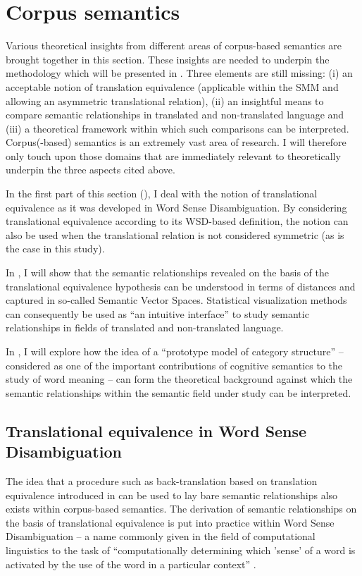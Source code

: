 \section{Corpus semantics}
\label{sec:2.4}  
Various theoretical insights from different areas of corpus-based semantics are brought together in this section. These insights are needed to underpin the methodology which will be presented in . Three elements are still missing: (i) an acceptable notion of translation equivalence (applicable within the SMM and allowing an asymmetric translational relation), (ii) an insightful means to compare semantic relationships in translated and non-translated language and (iii) a theoretical framework within which such comparisons can be interpreted. Corpus(-based) semantics is an extremely vast area of research. I will therefore only touch upon those domains that are immediately relevant to theoretically underpin the three aspects cited above.

In the first part of this section (), I deal with the notion of translational equivalence as it was developed in Word Sense Disambiguation. By considering translational equivalence according to its WSD-based definition, the notion can also be used when the translational relation is not considered symmetric (as is the case in this study).

In , I will show that the semantic relationships revealed on the basis of the translational equivalence hypothesis can be understood in terms of distances and captured in so-called Semantic Vector Spaces. Statistical visualization methods can consequently be used as “an intuitive interface” \citep*[17]{heylen_looking_2012} to study semantic relationships in fields of translated and non-translated language.

In , I will explore how the idea of a “prototype model of category structure” – considered as one of the important contributions of cognitive semantics to the study of word meaning \citep[577]{allan_lexical_2013} – can form the theoretical background against which the semantic relationships within the semantic field under study can be interpreted.

\subsection{Translational equivalence in Word Sense Disambiguation}
\label{sec:2.4.1}  
The idea that a procedure such as back-translation based on translation equivalence introduced in  can be used to lay bare semantic relationships also exists within corpus-based semantics. The derivation of semantic relationships on the basis of translational equivalence is put into practice within Word Sense Disambiguation – a name commonly given in the field of computational linguistics to the task of “computationally determining which 'sense' of a word is activated by the use of the word in a particular context” \citep[1]{agirre_word_2007}.

